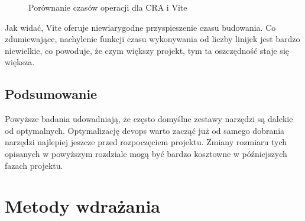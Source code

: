 \documentclass{article}
\begin{document}
\begin{figure}[H]
\centering
{}
\caption{Porównanie czasów operacji dla CRA i Vite}
\label{fig:cra_vs_vite}
\end{figure}

Jak widać, Vite oferuje niewiarygodne przyspieszenie czasu budowania. Co zdumiewające, nachylenie funkcji czasu wykonywania od liczby linijek jest bardzo niewielkie, co powoduje, że czym większy projekt, tym ta oszczędność staje się większa.

\subsection{Podsumowanie}

Powyższe badania udowadniają, że często domyślne zestawy narzędzi są dalekie od optymalnych. Optymalizację devops warto zacząć już od samego dobrania narzędzi najlepiej jeszcze przed rozpoczęciem projektu. Zmiany rozmiaru tych opisanych w powyższym rozdziale mogą być bardzo kosztowne w późniejszych fazach projektu.

\section{Metody wdrażania} \label{sectionMetodyWdrazania}
\end{document}
